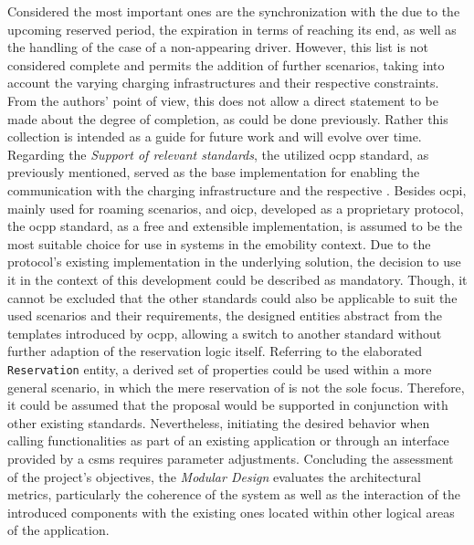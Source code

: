 Considered the most important ones are the synchronization with the  due to the upcoming reserved period, the expiration in terms of reaching its end, as well as the handling of the case of a non-appearing driver.
However, this list is not considered complete and permits the addition of further scenarios, taking into account the varying charging infrastructures and their respective constraints. 
From the authors' point of view, this does not allow a direct statement to be made about the degree of completion, as could be done previously. Rather this collection is intended as a guide for future work and will evolve over time.
Regarding the \textit{Support of relevant standards}, the utilized \acrshort{ocpp} standard, as previously mentioned, served as the base implementation for enabling the communication with the charging infrastructure and the respective .
Besides \acrshort{ocpi}, mainly used for roaming scenarios, and \acrshort{oicp}, developed as a proprietary protocol, the \acrshort{ocpp} standard, as a free and extensible implementation, is assumed to be the most suitable choice for use in systems in the \acrshort{emobility} context.
Due to the protocol's existing implementation in the underlying solution, the decision to use it in the context of this development could be described as mandatory.
Though, it cannot be excluded that the other standards could also be applicable to suit the used scenarios and their requirements, the designed entities abstract from the templates introduced by \acrshort{ocpp}, allowing a switch to another standard without further adaption of the reservation logic itself.
Referring to the elaborated \texttt{Reservation} entity, a derived set of properties could be used within a more general scenario, in which the mere reservation of  is not the sole focus. Therefore, it could be assumed that the proposal would be supported in conjunction with other existing standards. 
Nevertheless, initiating the desired behavior when calling functionalities as part of an existing application or through an interface provided by a \acrshort{csms} requires parameter adjustments.
Concluding the assessment of the project's objectives, the \textit{Modular Design} evaluates the architectural metrics, particularly the coherence of the system as well as the interaction of the introduced components with the existing ones located within other logical areas of the application.
